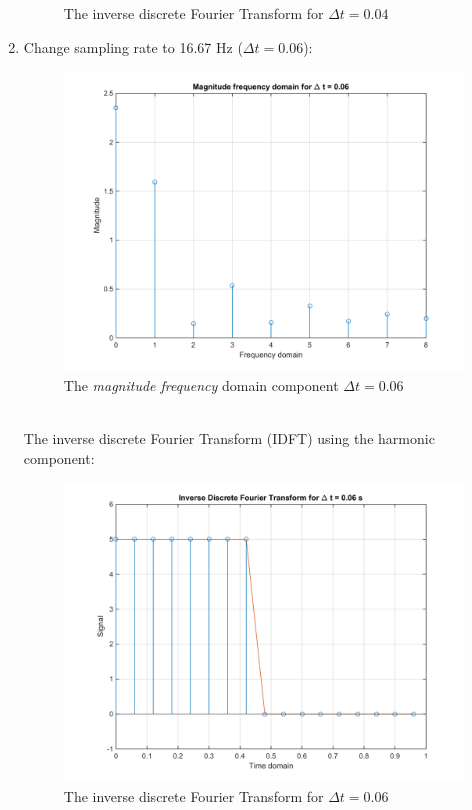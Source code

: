 \documentclass[14pt,a4paper]{article}
\begin{document}
\begin{enumerate}
\begin{figure}[htp]
		\caption{The inverse discrete Fourier Transform for  $\Delta t = 0.04$}
	\end{figure}
	\pagebreak
	\item Change sampling rate to 16.67 Hz ($\Delta t = 0.06$):
	\begin{figure}[htp]
		\centering
		\includegraphics[scale=0.58]{fn3_VB2_1.png}
		\caption{The \textit{magnitude frequency} domain component  $\Delta t = 0.06$}
	\end{figure}\\
	The inverse discrete Fourier Transform (IDFT) using the harmonic component:
	\begin{figure}[htp]
		\centering
		\includegraphics[scale=0.58]{fn3_VB2_2.png}
		\caption{The inverse discrete Fourier Transform for $\Delta t = 0.06$}
	\end{figure}\\
	\pagebreak
	

\end{enumerate}
\end{document}
